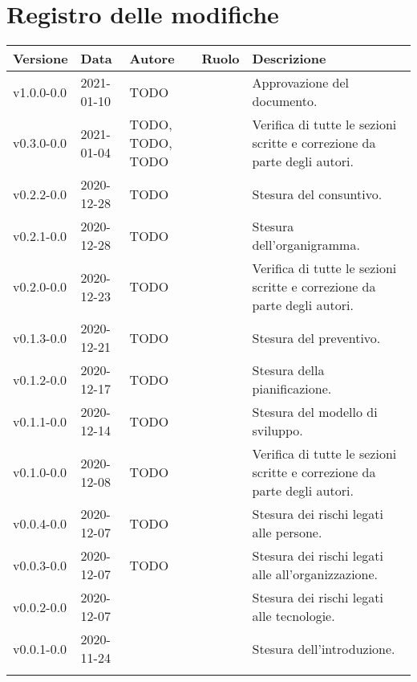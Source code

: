 \section*{\hfil Registro delle modifiche \hfil}
{
	\newlength{\freewidth}
	\setlength{\freewidth}{\dimexpr\textwidth-10\tabcolsep}
	\renewcommand{\arraystretch}{1.5}
	\centering
	\setlength{\aboverulesep}{0pt}
	\setlength{\belowrulesep}{0pt}
	\begin{longtable}{C{.131777\freewidth} C{.134036\freewidth} C{.263554\freewidth} C{.188254\freewidth} C{.282379\freewidth}}
		\toprule 
		\textbf{Versione} & \textbf{Data} & \textbf{Autore} & \textbf{Ruolo} & \textbf{Descrizione}\\
		\toprule
		\endhead

		v1.0.0-0.0 & 2021-01-10 & TODO & \RdP{} & Approvazione del documento. \\
		v0.3.0-0.0 & 2021-01-04 & TODO, TODO, TODO & \vers{} & Verifica di tutte le sezioni scritte e correzione da parte degli autori. \\

		v0.2.2-0.0 & 2020-12-28 & TODO & \ana{} & Stesura del consuntivo. \\
		v0.2.1-0.0 & 2020-12-28 & TODO & \ana{} & Stesura dell'organigramma. \\

		v0.2.0-0.0 & 2020-12-23 & TODO & \ver{} & Verifica di tutte le sezioni scritte e correzione da parte degli autori. \\
		v0.1.3-0.0 & 2020-12-21 & TODO & \ana{} & Stesura del preventivo. \\
		v0.1.2-0.0 & 2020-12-17 & TODO & \ana{} & Stesura della pianificazione. \\
		v0.1.1-0.0 & 2020-12-14 & TODO & \ana{} & Stesura del modello di sviluppo. \\

		v0.1.0-0.0 & 2020-12-08 & TODO & \ver{} & Verifica di tutte le sezioni scritte e correzione da parte degli autori. \\
		v0.0.4-0.0 & 2020-12-07 & TODO & \ana{} & Stesura dei rischi legati alle persone. \\
		v0.0.3-0.0 & 2020-12-07 & TODO & \ana{} & Stesura dei rischi legati alle all'organizzazione. \\
		v0.0.2-0.0 & 2020-12-07 & \Matteo{} & \ana{} & Stesura dei rischi legati alle tecnologie. \\
		v0.0.1-0.0 & 2020-11-24 & \Tommaso{} & \ana{} & Stesura dell'introduzione. \\
		
		\bottomrule
		\hiderowcolors
	\end{longtable}
}
